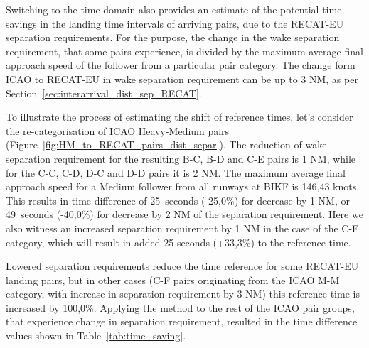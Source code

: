 Switching to the time domain also provides an estimate of the potential time savings in the landing time intervals of arriving pairs, due to the RECAT-EU separation requirements. For the purpose, the change in the wake separation requirement, that some pairs experience, is divided by the maximum average final approach speed of the follower from a particular pair category. The change form ICAO to RECAT-EU in wake separation requirement can be up to 3 NM, as per Section~\ref{sec:interarrival_dist_sep_RECAT}. 

To illustrate the process of estimating the shift of reference times, let's consider the re-categorisation of ICAO Heavy-Medium pairs (Figure~\ref{fig:HM_to_RECAT_pairs_dist_separ}). The reduction of wake separation requirement for the resulting B-C, B-D and C-E pairs is 1 NM, while for the C-C, C-D, D-C and D-D pairs it is 2 NM. The maximum average final approach speed for a Medium follower from all runways at BIKF is 146,43 knots. This results in time difference of 25~seconds (-25,0\%) for decrease by 1 NM, or 49~seconds (-40,0\%) for decrease by 2 NM of the separation requirement. Here we also witness an increased separation requirement by 1 NM in the case of the C-E category, which will result in added 25 seconds (+33,3\%) to the reference time.

Lowered separation requirements reduce the time reference for some RECAT-EU landing pairs, but in other cases (C-F pairs originating from the ICAO M-M category, with increase in separation requirement by 3 NM) this reference time is increased by 100,0\%. Applying the method to the rest of the ICAO pair groups, that experience change in separation requirement, resulted in the time difference values shown in Table~\ref{tab:time_saving}.

